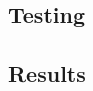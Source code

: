 \documentclass{article}
\begin{document}
\subsection{Testing}



\subsection{Results}

\end{document}
